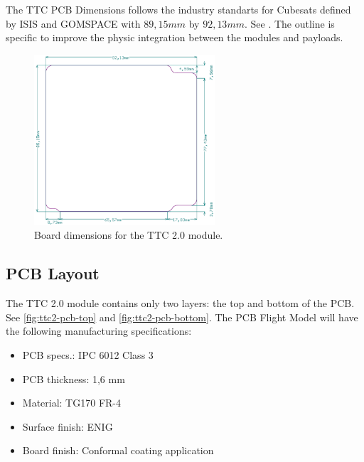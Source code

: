 The TTC PCB Dimensions follows the industry standarts for Cubesats defined by ISIS and GOMSPACE with $89,15 mm$ by $92,13 mm$. See \cite{nasa-handout}.  The outline is specific to improve the physic integration between the modules and payloads.

\begin{figure}[!ht]
    \begin{center}
        \includegraphics[width=0.6\textwidth]{figures/board-dimensions.png}
        \caption{Board dimensions for the TTC 2.0 module.}
        \label{fig:product-tree}
    \end{center}
\end{figure}

\subsection{PCB Layout}

The TTC 2.0 module contains only two layers: the top and bottom of the PCB. See \autoref{fig:ttc2-pcb-top} and \autoref{fig:ttc2-pcb-bottom}. The PCB Flight Model will have the following manufacturing specifications:

\begin{itemize}
    \item PCB specs.: IPC 6012 Class 3
    \item PCB thickness: 1,6 mm
    \item Material: TG170 FR-4
    \item Surface finish: ENIG
    \item Board finish: Conformal coating application
\end{itemize}

